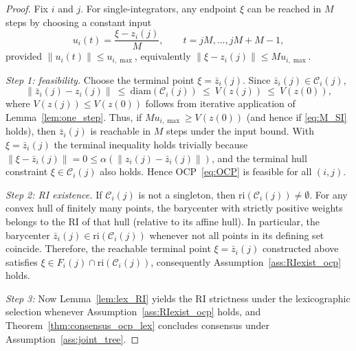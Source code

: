 \documentclass[12pt,draftcls,onecolumn]{IEEEtran}
\def\Cij{\mathcal{C}_i (j)}
\def\diam{\mathrm{diam}}
\def\ri{\mathrm{ri}}
\begin{document}
\begin{proof}
Fix $i$ and $j$. For single-integrators, any endpoint $\xi$ can be reached in $M$ steps by choosing a
constant input
\[
u_i(t)=\frac{\xi-z_i(j)}{M},\qquad t=jM,\dots,jM+M-1,
\]
provided $\|u_i(t)\|\le u_{i,\max}$, equivalently $\|\xi-z_i(j)\|\le M u_{i,\max}$.

\emph{Step 1: feasibility.} Choose the terminal point $\xi=\bar z_i(j)$. Since $\bar z_i(j)\in \Cij$,
\[
\|\bar z_i(j)-z_i(j)\|\ \le\ \diam(\Cij)\ \le\ V(z(j))\ \le\ V(z(0)),
\]
where $V(z(j))\le V(z(0))$ follows from iterative application of Lemma~\ref{lem:one_step}.
Thus, if $M u_{i,\max}\ge V(z(0))$ (and hence if \eqref{eq:M_SI} holds), then $\bar z_i(j)$ is reachable in
$M$ steps under the input bound. With $\xi=\bar z_i(j)$ the terminal inequality holds trivially because
$\|\xi-\bar z_i(j)\|=0\le \alpha(\|z_i(j)-\bar z_i(j)\|)$, and the terminal hull constraint $\xi\in \Cij$
also holds. Hence OCP~\eqref{eq:OCP} is feasible for all $(i,j)$.

\emph{Step 2: RI existence.} 
If $\Cij$ is not a singleton, then $\ri(\Cij)\neq\emptyset$. For any
convex hull of finitely many points, the barycenter with strictly positive weights belongs to the
RI of that hull (relative to its affine hull). In particular, the barycenter $\bar z_i(j)\in\ri(\Cij)$ whenever not all points in its defining set coincide. 
Therefore, the reachable terminal point $\xi=\bar z_i(j)$ constructed above satisfies $\xi\in F_i(j)\cap\ri(\Cij)$,
consequently Assumption~\ref{ass:RIexist_ocp} holds.

\emph{Step 3:} Now Lemma~\ref{lem:lex_RI} yields the RI strictness under the lexicographic selection whenever
Assumption~\ref{ass:RIexist_ocp} holds, and Theorem~\ref{thm:consensus_ocp_lex} concludes consensus under Assumption~\ref{ass:joint_tree}. 
\end{proof}

\medskip
\end{document}

